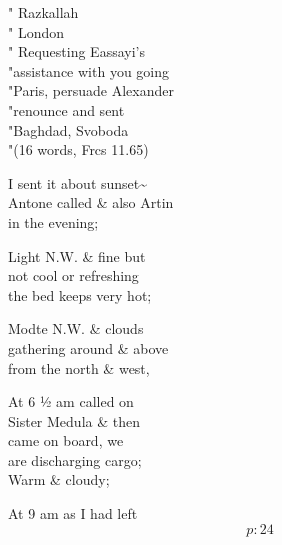 \documentclass{report}
\begin{document}


	\par{
 	" Razkallah\ \\" London\ \\" Requesting Eassayi’s\ \\"assistance with you going\ \\"Paris, persuade Alexander\ \\"renounce and sent\ \\"Baghdad, Svoboda\ \\"(16 words, Frcs 11.65)\ \\
	}

	\par{
 	I sent it about sunset\~{}\ \\Antone called \& also Artin\ \\in the evening;\ \\
	}

	\par{
 	Light N.W. \& fine but\ \\not cool or refreshing\ \\the bed keeps very hot;\ \\
	}

	\par{
 	Modte N.W. \& clouds\ \\gathering around \& above\ \\from the north \& west,\ \\
	}

	\par{
 	At 6 ½ am called on\ \\Sister Medula \& then\ \\came on board, we\ \\are discharging cargo;\ \\Warm \& cloudy;\ \\
	}

	\par{
 	At 9 am as I had left\ \\
  \[p: 24 \]

	}
\end{document}
